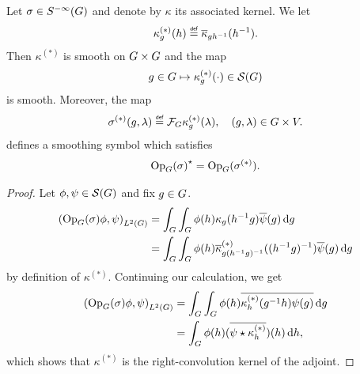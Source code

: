 \begin{lemma}
    Let $\sigma \in \SmoothingSymbols$ and denote by $\kappa$ its associated kernel.
    We let
    \begin{align*}
        \kappa_g^{(*)}(h) \defeq \conj \kappa_{g h^{-1}}(h^{-1}).
    \end{align*}
    Then $\kappa^{(*)}$ is smooth on $\Group \times \Group$ and the map
    \begin{align*}
        g \in \Group \mapsto \kappa_g^{(*)}(\dummy) \in \Schwartz \Group
    \end{align*}
    is smooth.
    Moreover,
    the map
    \begin{align*}
        \sigma^{(*)}(g, \lambda)
        \defeq \Fourier \kappa_g^{(*)}(\lambda),
        \quad (g, \lambda) \in \Group \times \VectorSpace.
    \end{align*}
    defines a smoothing symbol which satisfies
    \begin{align*}
        \adj {\Op(\sigma)}
        = \Op(\sigma^{(*)}).
    \end{align*}
\end{lemma}
\begin{proof}
    Let $\phi, \psi \in \Schwartz \Group$ and fix $g \in \Group$.
    \begin{align*}
        \ip [\Lebesgue 2 \Group] {\Op(\sigma) \phi} \psi
        &= \int_\Group \int_\Group \phi(h) \kappa_g(h^{-1} g) \conj \psi(g) \dd g\\
        &= \int_\Group \int_\Group \phi(h) \conj \kappa^{(*)}_{g (h^{-1} g)^{-1}}((h^{-1} g)^{-1}) \conj \psi(g) \dd g
    \end{align*}
    by definition of $\kappa^{(*)}$.
    Continuing our calculation,
    we get
    \begin{align*}
        \ip [\Lebesgue 2 \Group] {\Op(\sigma) \phi} \psi
        &= \int_\Group \int_\Group \phi(h) \conj{\kappa^{(*)}_{h}(g^{-1} h) \psi(g)} \dd g\\
        &= \int_\Group \phi(h) (\conj {\conv \psi {\kappa^{(*)}_h}})(h) \dd h,
    \end{align*}
    which shows that $\kappa^{(*)}$ is the right-convolution kernel of the adjoint.
\end{proof}

